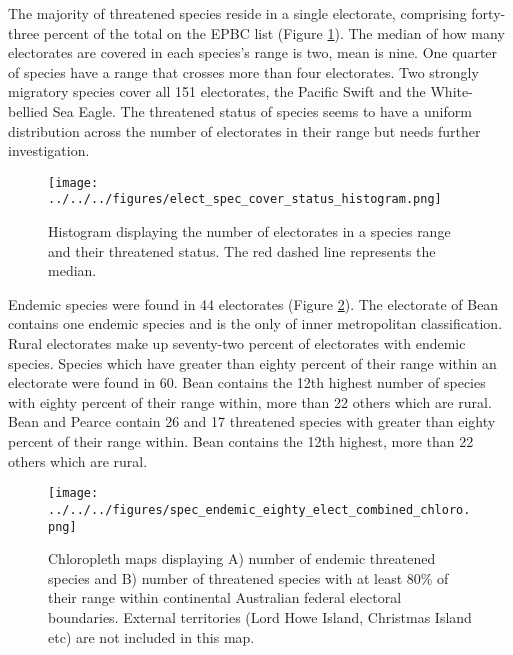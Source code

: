 \documentclass[a4paper,11pt]{article}
\begin{document}
The majority of threatened species reside in a single electorate, comprising forty-three percent of the total on the EPBC list (Figure \ref{fig:hist}). The median of how many electorates are covered in each species's range is two, mean is nine. One quarter of species have a range that crosses more than four electorates. Two strongly migratory species cover all 151 electorates, the Pacific Swift and the White-bellied Sea Eagle. The threatened status of species seems to have a uniform distribution across the number of electorates in their range but needs further investigation.

\begin{figure}[H]
	\centering
    \texttt{[image: ../../../figures/elect\_spec\_cover\_status\_histogram.png]}
    \caption{Histogram displaying the number of electorates in a species range and their threatened status. The red dashed line represents the median.}
    \label{fig:hist}
\end{figure}


Endemic species were found in 44 electorates (Figure \ref{fig:combined_chloro}). The electorate of Bean contains one endemic species and is the only of inner metropolitan classification. Rural electorates make up seventy-two percent of electorates with endemic species. Species which have greater than eighty percent of their range within an electorate were found in 60. Bean contains the 12th highest number of species with eighty percent of their range within, more than 22 others which are rural. Bean and Pearce contain 26 and 17 threatened species with greater than eighty percent of their range within. Bean contains the 12th highest, more than 22 others which are rural.

\begin{figure}[H]
	\centering
    \texttt{[image: ../../../figures/spec\_endemic\_eighty\_elect\_combined\_chloro.png]}
    \caption{Chloropleth maps displaying A) number of endemic threatened species and B) number of threatened species with at least 80\% of their range within continental Australian federal electoral boundaries. External territories (Lord Howe Island, Christmas Island etc) are not included in this map.}
    \label{fig:combined_chloro}
\end{figure}
\end{document}
